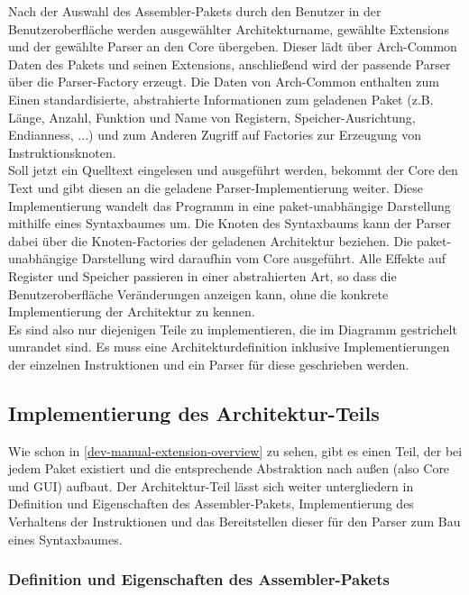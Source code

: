 Nach der Auswahl des Assembler-Pakets durch den Benutzer in der
Benutzeroberfläche werden ausgewählter Architekturname, gewählte Extensions und
der gewählte Parser an den Core übergeben. Dieser lädt über Arch-Common Daten
des Pakets und seinen Extensions, anschließend wird der passende Parser über die
Parser-Factory erzeugt. Die Daten von Arch-Common enthalten zum Einen
standardisierte, abstrahierte Informationen zum geladenen Paket (z.B. Länge,
Anzahl, Funktion und Name von Registern, Speicher-Ausrichtung, Endianness, ...)
und zum Anderen Zugriff auf Factories zur Erzeugung von Instruktionsknoten.\\
Soll jetzt ein Quelltext eingelesen und ausgeführt werden, bekommt der Core den
Text und gibt diesen an die geladene Parser-Implementierung weiter. Diese
Implementierung wandelt das Programm in eine paket-unabhängige Darstellung
mithilfe eines Syntaxbaumes um. Die Knoten des Syntaxbaums kann der Parser dabei
über die Knoten-Factories der geladenen Architektur beziehen. Die
paket-unabhängige Darstellung wird daraufhin vom Core ausgeführt. Alle Effekte
auf Register und Speicher passieren in einer abstrahierten Art, so dass die
Benutzeroberfläche Veränderungen anzeigen kann, ohne die konkrete
Implementierung der Architektur zu kennen.\\

Es sind also nur diejenigen Teile zu implementieren, die im Diagramm gestrichelt
umrandet sind. Es muss eine Architekturdefinition inklusive Implementierungen
der einzelnen Instruktionen und ein Parser für diese geschrieben werden.

\subsection{Implementierung des Architektur-Teils}

Wie schon in \autoref{dev-manual-extension-overview} zu sehen, gibt es einen
Teil, der bei jedem Paket existiert und die entsprechende Abstraktion nach außen
(also Core und GUI) aufbaut. Der Architektur-Teil lässt sich weiter
untergliedern in Definition und Eigenschaften des Assembler-Pakets,
Implementierung des Verhaltens der Instruktionen und das Bereitstellen dieser
für den Parser zum Bau eines Syntaxbaumes.

\subsubsection{Definition und Eigenschaften des Assembler-Pakets}

